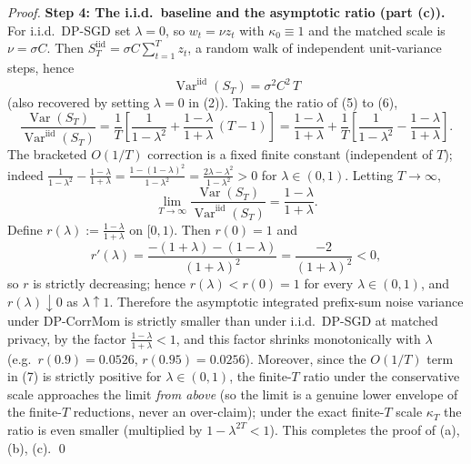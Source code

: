 \begin{proof}
\par\smallskip\noindent\textbf{Step 4: The i.i.d.\ baseline and the asymptotic ratio (part (c)).}\quad 
For i.i.d.\ DP-SGD set $\lambda=0$, so $w_t=\nu z_t$ with $\kappa_0\equiv1$ and the matched scale is $\nu=\sigma C$. Then $S_T^{\mathrm{iid}}=\sigma C\sum_{t=1}^T z_t$, a random walk of independent unit-variance steps, hence
\[
\operatorname{Var}^{\mathrm{iid}}(S_T)=\sigma^2C^2\,T
\tag{6}
\]
(also recovered by setting $\lambda=0$ in (2)). Taking the ratio of (5) to (6),
\[
\frac{\operatorname{Var}(S_T)}{\operatorname{Var}^{\mathrm{iid}}(S_T)}
=\frac{1}{T}\left[\frac{1}{1-\lambda^2}+\frac{1-\lambda}{1+\lambda}\,(T-1)\right]
=\frac{1-\lambda}{1+\lambda}+\frac{1}{T}\left[\frac{1}{1-\lambda^2}-\frac{1-\lambda}{1+\lambda}\right].
\tag{7}
\]
The bracketed $O(1/T)$ correction is a fixed finite constant (independent of $T$); indeed
$\frac{1}{1-\lambda^2}-\frac{1-\lambda}{1+\lambda}=\frac{1-(1-\lambda)^2}{1-\lambda^2}=\frac{2\lambda-\lambda^2}{1-\lambda^2}>0$ for $\lambda\in(0,1)$. Letting $T\to\infty$,
\[
\lim_{T\to\infty}\frac{\operatorname{Var}(S_T)}{\operatorname{Var}^{\mathrm{iid}}(S_T)}=\frac{1-\lambda}{1+\lambda}.
\tag{8}
\]
Define $r(\lambda):=\frac{1-\lambda}{1+\lambda}$ on $[0,1)$. Then $r(0)=1$ and
\[
r'(\lambda)=\frac{-(1+\lambda)-(1-\lambda)}{(1+\lambda)^2}=\frac{-2}{(1+\lambda)^2}<0,
\]
so $r$ is strictly decreasing; hence $r(\lambda)<r(0)=1$ for every $\lambda\in(0,1)$, and $r(\lambda)\downarrow0$ as $\lambda\uparrow1$. Therefore the asymptotic integrated prefix-sum noise variance under DP-CorrMom is strictly smaller than under i.i.d.\ DP-SGD at matched privacy, by the factor $\frac{1-\lambda}{1+\lambda}<1$, and this factor shrinks monotonically with $\lambda$ (e.g.\ $r(0.9)=0.0526$, $r(0.95)=0.0256$). Moreover, since the $O(1/T)$ term in (7) is strictly positive for $\lambda\in(0,1)$, the finite-$T$ ratio under the conservative scale approaches the limit \emph{from above} (so the limit is a genuine lower envelope of the finite-$T$ reductions, never an over-claim); under the exact finite-$T$ scale $\kappa_T$ the ratio is even smaller (multiplied by $1-\lambda^{2T}<1$). This completes the proof of (a), (b), (c). \qed


\end{proof}
